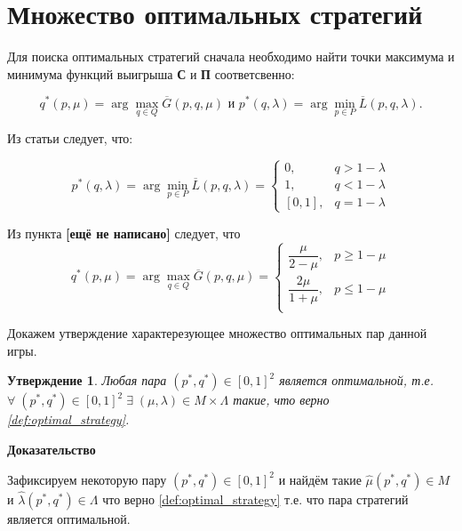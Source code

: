 \section{Множество оптимальных стратегий}

Для поиска оптимальных стратегий сначала необходимо найти точки максимума и минимума 
функций выигрыша \textbf{С} и \textbf{П} соответсвенно:

$$
	q^*(p, \mu) = \arg \max \limits_{q \in Q} \overline G(p, q, \mu)
	\textrm{ и }
	p^*(q, \lambda) = \arg \min \limits_{p \in P} \overline L(p, q, \lambda).
$$

Из статьи \cite{novikova} следует, что:

\begin{equation}
	p^*(q, \lambda)=
	\arg \min \limits_{p \in P} \overline L(p, q, \lambda) =
	\begin{cases}
		0, & q > 1 - \lambda \\
		1, & q < 1 - \lambda \\
		[0,1], & q = 1 - \lambda
	\end{cases}
\end{equation}

Из пункта \textbf{[ещё не написано]} следует, что
\begin{equation}
	q^*(p, \mu) = \arg \max \limits_{q \in Q} \overline G(p, q, \mu) =
	\begin{cases}
		\dfrac{\mu}{2 - \mu}, & p \geqslant 1 - \mu \\
		\dfrac{2\mu}{1 + \mu}, & p \leqslant 1 -\mu \\
	\end{cases}
\end{equation}

Докажем утверждение характерезующее множество оптимальных пар данной игры.

\newtheorem{State}{Утверждение}\label{State:opt_strat_1}
\begin{State}
	Любая пара $(p^*, q^*) \in [0, 1]^2$ является оптимальной, т.е.  
	$\forall \; (p^*, q^*) \in [0, 1]^2 \; \exists \; 
	(\mu, \lambda) \in M \times \Lambda$
	такие, что верно \eqref{def:optimal_strategy}.
\end{State}


\textbf{Доказательство}

Зафиксируем некоторую пару  $(p^*, q^*) \in [0, 1]^2$ и найдём такие 
$\hat \mu (p^*, q^*) \in M$ и $\hat \lambda (p^*, q^*) \in \Lambda$ 
что верно \eqref{def:optimal_strategy} т.е. что пара стратегий является оптимальной.

